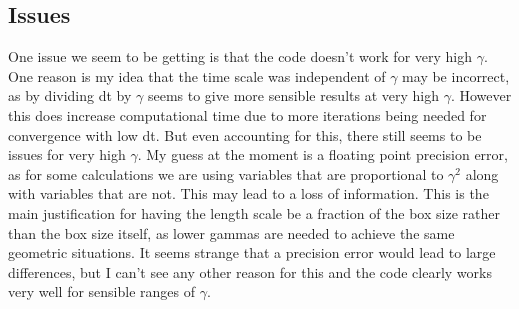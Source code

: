 \documentclass[10pt]{article}
\numberwithin{equation}{section}
\begin{document}
\begin{multicols}{2}
\section{Issues}
One issue we seem to be getting is that the code doesn't work for very high $\gamma$. One reason is my idea that the time scale was independent of $\gamma$ may be incorrect, as by dividing dt by $\gamma$ seems to give more sensible results at very high $\gamma$. However this does increase computational time due to more iterations being needed for convergence with low dt. But even accounting for this, there still seems to be issues for very high $\gamma$. My guess at the moment is a floating point precision error, as for some calculations we are using variables that are proportional to $\gamma^{2}$ along with variables that are not. This may lead to a loss of information. This is the main justification for having the length scale be a fraction of the box size rather than the box size itself, as lower gammas are needed to achieve the same geometric situations. It seems strange that a precision error would lead to large differences, but I can't see any other reason for this and the code clearly works very well for sensible ranges of $\gamma$. 

 \end{multicols}




\end{document}
